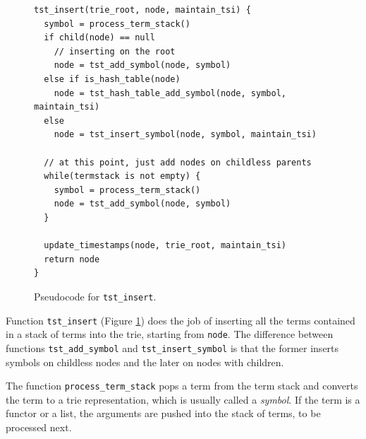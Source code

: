 \begin{figure}[ht]
\begin{Verbatim}[fontsize=\small]
tst_insert(trie_root, node, maintain_tsi) {
  symbol = process_term_stack()
  if child(node) == null
    // inserting on the root
    node = tst_add_symbol(node, symbol)
  else if is_hash_table(node)
    node = tst_hash_table_add_symbol(node, symbol, maintain_tsi)
  else
    node = tst_insert_symbol(node, symbol, maintain_tsi)
  
  // at this point, just add nodes on childless parents
  while(termstack is not empty) {
    symbol = process_term_stack()
    node = tst_add_symbol(node, symbol)
  }
  
  update_timestamps(node, trie_root, maintain_tsi)
  return node
}
\end{Verbatim}
\caption{Pseudo\-code for \texttt{tst\_insert}.}
\label{fig:tst_insert}
\end{figure}

Function \texttt{tst\_insert} (Figure \ref{fig:tst_insert}) does the job of inserting
all the terms contained in a stack of terms into the trie, starting from \texttt{node}.
The difference between functions \texttt{tst\_add\_symbol} and \texttt{tst\_insert\_symbol}
is that the former inserts symbols on childless nodes and the later on nodes with children.

The function \texttt{process\_term\_stack} pops a term from the term stack and converts the term
to a trie representation, which is usually called a \textit{symbol}. If the term is a functor or a list,
the arguments are pushed into the stack of terms, to be processed next.

